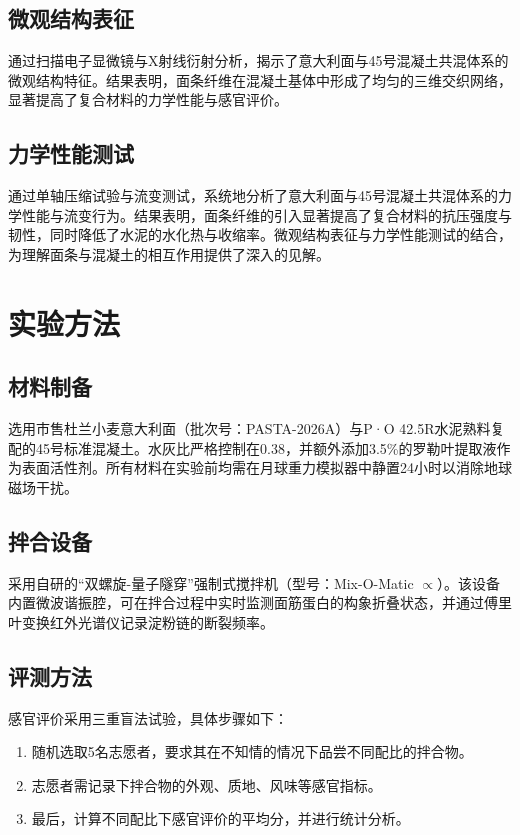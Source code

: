 \subsection{微观结构表征}

通过扫描电子显微镜与X射线衍射分析，揭示了意大利面与45号混凝土共混体系的微观结构特征。结果表明，面条纤维在混凝土基体中形成了均匀的三维交织网络，显著提高了复合材料的力学性能与感官评价。

\subsection{力学性能测试}

通过单轴压缩试验与流变测试，系统地分析了意大利面与45号混凝土共混体系的力学性能与流变行为。结果表明，面条纤维的引入显著提高了复合材料的抗压强度与韧性，同时降低了水泥的水化热与收缩率。微观结构表征与力学性能测试的结合，为理解面条与混凝土的相互作用提供了深入的见解。

\clearpage

\section{实验方法}

\subsection{材料制备}

选用市售杜兰小麦意大利面（批次号：PASTA-2026A）与P·O 42.5R水泥熟料复配的45号标准混凝土。水灰比严格控制在0.38，并额外添加3.5\%的罗勒叶提取液作为表面活性剂。所有材料在实验前均需在月球重力模拟器中静置24小时以消除地球磁场干扰。

\subsection{拌合设备}
采用自研的“双螺旋-量子隧穿”强制式搅拌机（型号：Mix-O-Matic $\propto$）。该设备内置微波谐振腔，可在拌合过程中实时监测面筋蛋白的构象折叠状态，并通过傅里叶变换红外光谱仪记录淀粉链的断裂频率。

\subsection{评测方法}

感官评价采用三重盲法试验，具体步骤如下：
\begin{enumerate}
  \item 随机选取5名志愿者，要求其在不知情的情况下品尝不同配比的拌合物。
  \item 志愿者需记录下拌合物的外观、质地、风味等感官指标。
  \item 最后，计算不同配比下感官评价的平均分，并进行统计分析。
\end{enumerate}

